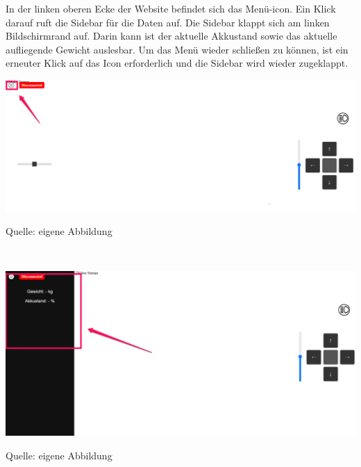 \documentclass[ngerman,12pt,a4paper]{article}
\begin{document}
	In der linken oberen Ecke der Website befindet sich das Menü-icon. Ein Klick darauf ruft die Sidebar für die Daten auf. Die Sidebar klappt sich am linken Bildschirmrand auf. Darin kann ist der aktuelle Akkustand sowie das aktuelle aufliegende Gewicht auslesbar. Um das Menü wieder schließen zu können, ist ein erneuter Klick auf das Icon erforderlich und die Sidebar wird wieder zugeklappt. \\[0.5cm]	
	\begin{center}
		\begin{minipage}[t]{1\textwidth}
			\includegraphics[scale=0.4]{Pictures/menu-web1}
			\label{fig:menu-web}
			\vspace{-10pt}
			\begin{center}
				\par\small Quelle: eigene Abbildung 
			\end{center}
		\end{minipage} \\[0.75cm]
	\end{center}
	\begin{center}
		\begin{minipage}[t]{1\textwidth}
			\includegraphics[scale=0.9]{Pictures/sensordaten-web}
			\label{fig:sidebar}
			\vspace{-10pt}
			\begin{center}
				\par\small Quelle: eigene Abbildung 
			\end{center}
		\end{minipage} \\[0.75cm]
	\end{center}
\end{document}
